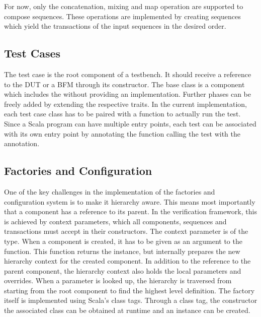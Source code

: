 For now, only the concatenation, mixing and map operation are supported to compose sequences. These operations are implemented by creating sequences which yield the transactions of the input sequences in the desired order. 

\subsection{Test Cases} %

The test case is the root component of a testbench. It should receive a reference to the DUT or a BFM through its
constructor. The  base class is a component which includes the  without providing an
implementation. Further phases can be freely added by extending the respective traits. In the current implementation,
each test case class has to be paired with a  function to actually run the test. Since a Scala program
can have multiple entry points, each test can be associated with its own entry point by annotating the function
calling the test with the  annotation.

\subsection{Factories and Configuration} %


One of the key challenges in the implementation of the factories and configuration system is to make it hierarchy aware. This means most importantly that a component has a reference to its parent. In the verification framework, this is achieved by context parameters, which all components, sequences and transactions must accept in their constructors. The context parameter is of the  type. When a component is created, it has to be given as an argument to the  function. This function returns the instance, but internally prepares the new hierarchy context for the created component. In addition to the reference to the parent component, the hierarchy context also holds the local parameters and overrides. When a parameter is looked up, the hierarchy is traversed from starting from the root component to find the highest level definition. The factory itself is implemented using Scala's class tags. Through a class tag, the constructor the associated class can be obtained at runtime and an instance can be created.

